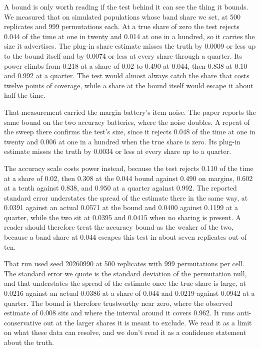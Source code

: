 A bound is only worth reading if the test behind it can see the thing it bounds. We measured that on simulated populations whose band share we set, at 500 replicates and 999 permutations each. At a true share of zero the test rejects 0.044 of the time at one in twenty and 0.014 at one in a hundred, so it carries the size it advertises. The plug-in share estimate misses the truth by 0.0009 or less up to the bound itself and by 0.0074 or less at every share through a quarter. Its power climbs from 0.218 at a share of 0.02 to 0.490 at 0.044, then 0.838 at 0.10 and 0.992 at a quarter. The test would almost always catch the share that costs twelve points of coverage, while a share at the bound itself would escape it about half the time.

That measurement carried the margin battery's item noise. The paper reports the same bound on the two accuracy batteries, where the noise doubles. A repeat of the sweep there confirms the test's size, since it rejects 0.048 of the time at one in twenty and 0.006 at one in a hundred when the true share is zero. Its plug-in estimate misses the truth by 0.0034 or less at every share up to a quarter.

The accuracy scale costs power instead, because the test rejects 0.110 of the time at a share of 0.02, then 0.308 at the 0.044 bound against 0.490 on margins, 0.602 at a tenth against 0.838, and 0.950 at a quarter against 0.992. The reported standard error understates the spread of the estimate there in the same way, at 0.0391 against an actual 0.0571 at the bound and 0.0400 against 0.1199 at a quarter, while the two sit at 0.0395 and 0.0415 when no sharing is present. A reader should therefore treat the accuracy bound as the weaker of the two, because a band share at 0.044 escapes this test in about seven replicates out of ten.

That run used seed 20260990 at 500 replicates with 999 permutations per cell. The standard error we quote is the standard deviation of the permutation null, and that understates the spread of the estimate once the true share is large, at 0.0216 against an actual 0.0386 at a share of 0.044 and 0.0219 against 0.0942 at a quarter. The bound is therefore trustworthy near zero, where the observed estimate of 0.008 sits and where the interval around it covers 0.962. It runs anti-conservative out at the larger shares it is meant to exclude. We read it as a limit on what these data can resolve, and we don't read it as a confidence statement about the truth.

